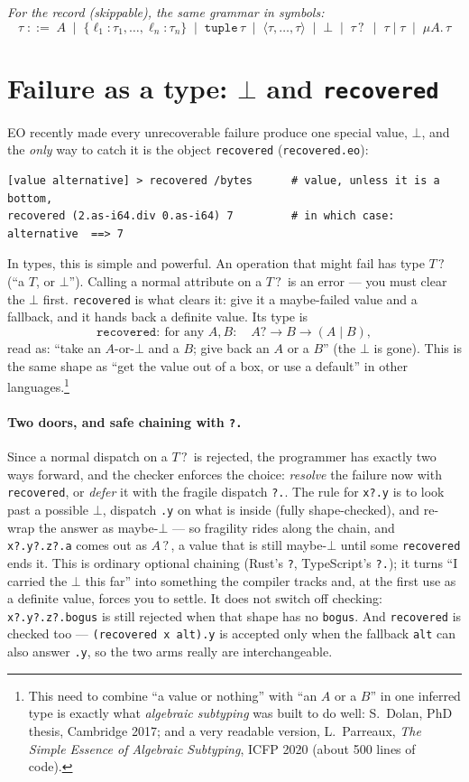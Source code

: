 \documentclass[10pt]{article}
\newcommand{\ty}[1]{\mathtt{#1}}     %
\newcommand{\arr}{\to}               %
\newcommand{\opt}{\mathbin{?}}       %
\begin{document}
\emph{For the record (skippable), the same grammar in symbols:}
\[
\tau \;::=\; A \;\mid\; \{\ell_1{:}\tau_1,\dots,\ell_n{:}\tau_n\} \;\mid\;
\ty{tuple}\,\tau \;\mid\; \langle\tau,\dots,\tau\rangle \;\mid\; \bot \;\mid\;
\tau\opt \;\mid\; \tau \mid \tau \;\mid\; \mu A.\,\tau
\]

\section{Failure as a type: $\bot$ and \texttt{recovered}}\label{sec:fail}

EO recently made every unrecoverable failure produce one special value,
$\bot$, and the \emph{only} way to catch it is the object \verb|recovered|
(\texttt{recovered.eo}):
\begin{lstlisting}
[value alternative] > recovered /bytes      # value, unless it is a bottom,
recovered (2.as-i64.div 0.as-i64) 7         # in which case: alternative  ==> 7
\end{lstlisting}
In types, this is simple and powerful. An operation that might fail has type
$T\opt$ (``a $T$, or $\bot$''). Calling a normal attribute on a $T\opt$ is an
error --- you must clear the $\bot$ first. \verb|recovered| is what clears it:
give it a maybe-failed value and a fallback, and it hands back a definite value.
Its type is
\[
\ty{recovered} :\ \text{for any } A, B:\quad A\opt \arr B \arr (A \mid B),
\]
read as: ``take an $A$-or-$\bot$ and a $B$; give back an $A$ or a $B$'' (the
$\bot$ is gone). This is the same shape as ``get the value out of a box, or use
a default'' in other languages.\footnote{This need to combine ``a value or
nothing'' with ``an $A$ or a $B$'' in one inferred type is exactly what
\emph{algebraic subtyping} was built to do well: S.~Dolan, PhD thesis,
Cambridge 2017; and a very readable version, L.~Parreaux, \emph{The Simple
Essence of Algebraic Subtyping}, ICFP 2020 (about 500 lines of code).}

\paragraph{Two doors, and safe chaining with \texttt{?.}} Since a normal dispatch
on a $T\opt$ is rejected, the programmer has exactly two ways forward, and the
checker enforces the choice: \emph{resolve} the failure now with \verb|recovered|,
or \emph{defer} it with the fragile dispatch \verb|?.|. The rule for \verb|x?.y|
is to look past a possible $\bot$, dispatch \verb|.y| on what is inside (fully
shape-checked), and re-wrap the answer as maybe-$\bot$ --- so fragility rides
along the chain, and \verb|x?.y?.z?.a| comes out as $A\opt$, a value that is still
maybe-$\bot$ until some \verb|recovered| ends it. This is ordinary optional
chaining (Rust's \verb|?|, TypeScript's \verb|?.|); it turns ``I carried the
$\bot$ this far'' into something the compiler tracks and, at the first use as a
definite value, forces you to settle. It does not switch off checking:
\verb|x?.y?.z?.bogus| is still rejected when that shape has no \verb|bogus|. And
\verb|recovered| is checked too --- \verb|(recovered x alt).y| is accepted only
when the fallback \verb|alt| can also answer \verb|.y|, so the two arms really are
interchangeable.
\end{document}
